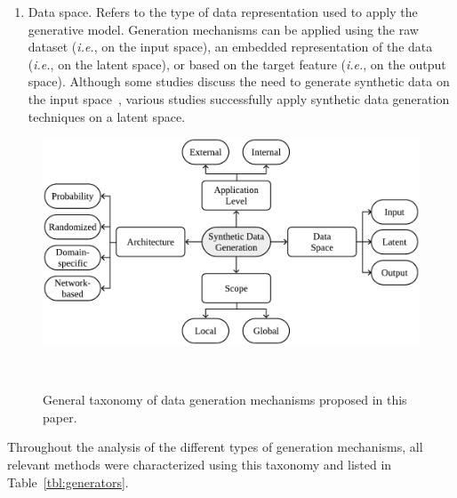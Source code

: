 \begin{enumerate}
    \item Data space. Refers to the type of data representation used to apply
        the generative model. Generation mechanisms can be applied using the
        raw dataset (\textit{i.e.}, on the input space), an embedded
        representation of the data (\textit{i.e.}, on the latent space), or
        based on the target feature (\textit{i.e.}, on the output space).
        Although some studies discuss the need to generate synthetic data on
        the input space~\cite{dankar2021fake, patki2016synthetic}, 
        various studies successfully apply synthetic data generation
        techniques on a latent space.

\end{enumerate}

\begin{figure}
	\centering
	\includegraphics[width=.95\linewidth]{figures/synthetic-data-review/data-generation-taxonomy}
    \caption{General taxonomy of data generation mechanisms proposed in this
        paper.
    }~\label{fig:data-generation-taxonomy}
\end{figure}

Throughout the analysis of the different types of generation mechanisms, all
relevant methods were characterized using this taxonomy and listed in
Table~\ref{tbl:generators}.


